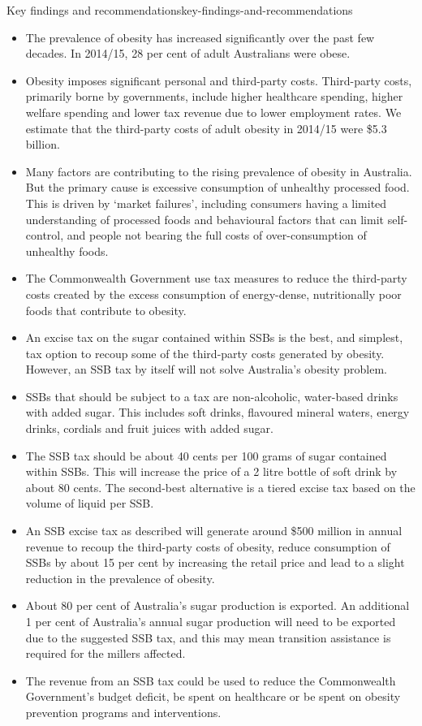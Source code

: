 \documentclass[embargoed]{grattan}
\begin{document}
\begin{bigbox*}{Key findings and recommendations}{key-findings-and-recommendations}

\begin{itemize}
\item
  The prevalence of obesity has increased significantly over the past few decades.
In 2014/15, 28 per cent of adult Australians were obese.
\item
  Obesity imposes significant personal and third-party costs.
Third-party costs, primarily borne by governments, include higher healthcare spending, higher welfare spending and lower tax revenue due to lower employment rates.
We estimate that the third-party costs of adult obesity in 2014/15 were \$5.3 billion.
\item
  Many factors are contributing to the rising prevalence of obesity in Australia.
But the primary cause is excessive consumption of unhealthy processed food.
This is driven by `market failures', including consumers having a limited understanding of processed foods and behavioural factors that can limit self-control, and people not bearing the full costs of over-consumption of unhealthy foods.
\item
  The Commonwealth Government use tax measures to reduce the third-party costs created by the excess consumption of energy-dense, nutritionally poor foods that contribute to obesity.
\item
  An excise tax on the sugar contained within SSBs is the best, and simplest, tax option to recoup some of the third-party costs generated by obesity.
However, an SSB tax by itself will not solve Australia's obesity problem.
\item
  SSBs that should be subject to a tax are non-alcoholic, water-based drinks with added sugar.
This includes soft drinks, flavoured mineral waters, energy drinks, cordials and fruit juices with added sugar.
\item
  The SSB tax should be about 40 cents per 100 grams of sugar contained within SSBs.
This will increase the price of a 2 litre bottle of soft drink by about 80 cents.
The second-best alternative is a tiered excise tax based on the volume of liquid per SSB.
\item
  An SSB excise tax as described will generate around \$500 million in annual revenue to recoup the third-party costs of obesity, reduce consumption of SSBs by about 15 per cent by increasing the retail price and lead to a slight reduction in the prevalence of obesity.
\item
   About 80 per cent of Australia's sugar production is exported.
An additional 1 per cent of Australia's annual sugar production will need to be exported due to the suggested SSB tax, and this may mean transition assistance is required for the millers affected.
\item
  The revenue from an SSB tax could be used to reduce the Commonwealth Government's budget deficit, be spent on healthcare or be spent on obesity prevention programs and interventions.
\end{itemize}
\end{bigbox*}
\end{document}
